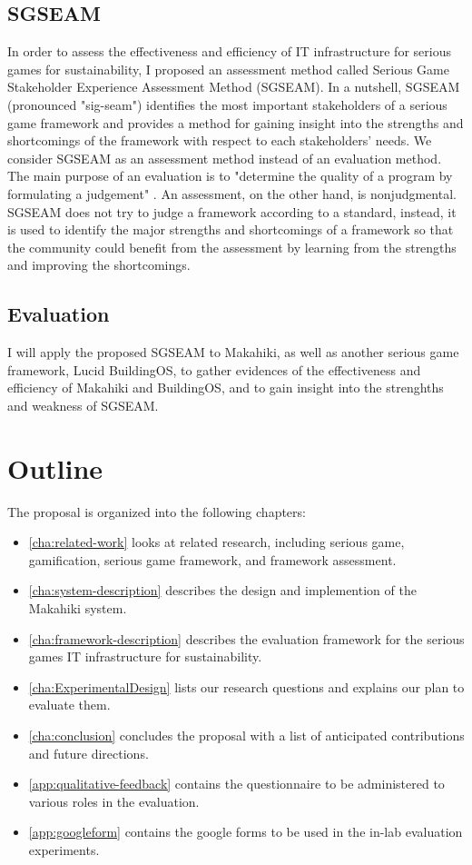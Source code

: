 \subsection{SGSEAM}
In order to assess the effectiveness and efficiency of IT infrastructure for serious games for sustainability, I proposed an assessment method called Serious Game Stakeholder Experience Assessment Method (SGSEAM). In a nutshell, SGSEAM (pronounced "sig-seam")
identifies the most important stakeholders of a
serious game framework and provides a method for gaining insight into the strengths
and shortcomings of the framework with respect to each stakeholders' needs. We consider
SGSEAM as an assessment method instead of an evaluation method. The main purpose of an
evaluation is to "determine the quality of a program by formulating a judgement"
\cite{hurteau2009legitimate}. An assessment, on the other hand, is nonjudgmental. SGSEAM does
not try to judge a framework according to a standard, instead, it is used to identify the major
strengths and shortcomings of a framework so that the community could benefit from the
assessment by learning from the strengths and improving the shortcomings.

\subsection{Evaluation}
I will apply the proposed SGSEAM to Makahiki, as well as another serious game framework, Lucid BuildingOS\cite{building-dashboard}, to gather evidences of the effectiveness and efficiency of Makahiki and BuildingOS, and to gain insight into the strenghths and weakness of SGSEAM.

\section{Outline}

The proposal is organized into the following chapters:

\begin{itemize}
	\item \autoref{cha:related-work} looks at related research, including serious game, gamification, serious game framework, and framework assessment.
	\item \autoref{cha:system-description} describes the design and implemention of the Makahiki system.
    \item \autoref{cha:framework-description} describes the evaluation framework for the serious games IT infrastructure for sustainability.
	\item \autoref{cha:ExperimentalDesign} lists our research questions and explains our plan to evaluate them.
	\item \autoref{cha:conclusion} concludes the proposal with a list of anticipated contributions and future directions.
	\item \autoref{app:qualitative-feedback} contains the questionnaire to be administered to various roles in the evaluation.
    \item \autoref{app:googleform} contains the google forms to be used in the in-lab evaluation experiments.
\end{itemize}
